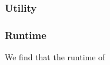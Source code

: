 \documentclass[conference]{IEEEtran}
\begin{document}
\subsubsection{Utility}
\subsubsection{Runtime}
We find that the runtime of 









\end{document}
